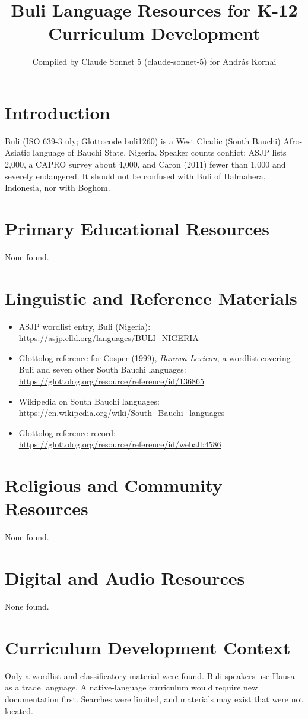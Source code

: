 \documentclass[12pt]{article}
\title{Buli Language Resources for K-12 Curriculum Development}
\author{Compiled by Claude Sonnet 5 (claude-sonnet-5) for Andr\'as Kornai}
\date{}
\begin{document}
\maketitle

\section{Introduction}
Buli (ISO 639-3 uly; Glottocode buli1260) is a West Chadic (South Bauchi) Afro-Asiatic language of Bauchi State, Nigeria. Speaker counts conflict: ASJP lists 2,000, a CAPRO survey about 4,000, and Caron (2011) fewer than 1,000 and severely endangered. It should not be confused with Buli of Halmahera, Indonesia, nor with Boghom.

\section{Primary Educational Resources}
None found.

\section{Linguistic and Reference Materials}
\begin{itemize}
\item ASJP wordlist entry, Buli (Nigeria): \url{https://asjp.clld.org/languages/BULI_NIGERIA}
\item Glottolog reference for Cosper (1999), \emph{Barawa Lexicon}, a wordlist covering Buli and seven other South Bauchi languages: \url{https://glottolog.org/resource/reference/id/136865}
\item Wikipedia on South Bauchi languages: \url{https://en.wikipedia.org/wiki/South_Bauchi_languages}
\item Glottolog reference record: \url{https://glottolog.org/resource/reference/id/weball:4586}
\end{itemize}

\section{Religious and Community Resources}
None found.

\section{Digital and Audio Resources}
None found.

\section{Curriculum Development Context}
Only a wordlist and classificatory material were found. Buli speakers use Hausa as a trade language. A native-language curriculum would require new documentation first. Searches were limited, and materials may exist that were not located.
\end{document}
